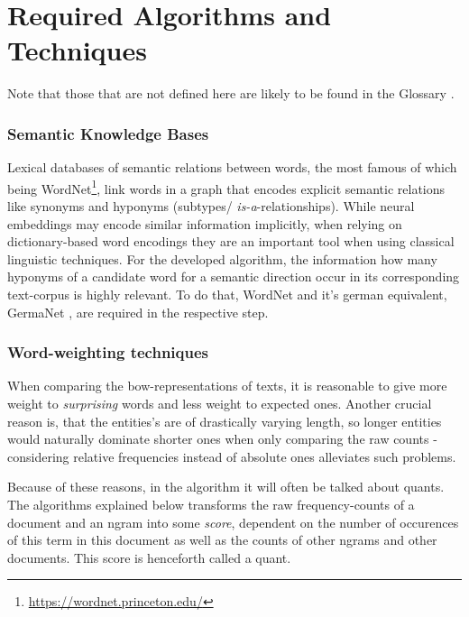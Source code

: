\section{Required Algorithms and Techniques}

Note that those that are not defined here are likely to be found in the Glossary .

\subsubsection*{Semantic Knowledge Bases}

Lexical databases of semantic relations between words, the most famous of which being WordNet\footnote{\url{https://wordnet.princeton.edu/}}, link words in a graph that encodes explicit semantic relations like synonyms and hyponyms (subtypes/ \emph{is-a}-relationships). While neural %
embeddings may encode similar information implicitly, when relying on dictionary-based word encodings they are an important tool when using classical linguistic techniques. For the developed algorithm, the information how many hyponyms of a candidate word for a semantic direction %
occur in its corresponding text-corpus is highly relevant. To do that, WordNet \cite{Miller1995} and it's german equivalent, GermaNet \cite{hamp-feldweg-1997-germanet,Henrich}, are required in the respective step.


\subsubsection*{Word-weighting techniques}

\label{sec:word_count_techniques}

When comparing the \gls{bow}-representations of texts, it is reasonable to give more weight to \emph{surprising} words and less weight to expected ones.  \cite[156]{Turney2010} 
Another crucial reason is, that the entities's are of drastically varying length, so longer entities would naturally dominate shorter ones when only comparing the raw counts - considering relative frequencies instead of absolute ones alleviates such problems.

Because of these reasons, in the algorithm it will often be talked about \glspl{quant}. The algorithms explained below transforms the raw frequency-counts of a document and an \gls{ngram} into some \emph{score}, dependent on the number of occurences of this term in this document as well as the counts of other \glspl{ngram} and other documents. This score is henceforth called a \gls{quant}.



